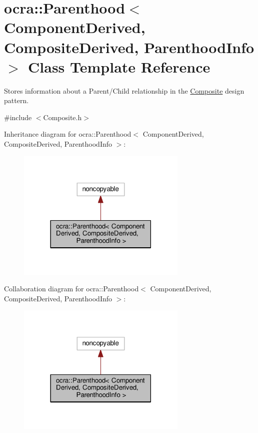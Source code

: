 \hypertarget{classocra_1_1Parenthood}{}\section{ocra\+:\+:Parenthood$<$ Component\+Derived, Composite\+Derived, Parenthood\+Info $>$ Class Template Reference}
\label{classocra_1_1Parenthood}


Stores information about a Parent/\+Child relationship in the \hyperlink{classocra_1_1Composite}{Composite} design pattern.  




{\ttfamily \#include $<$Composite.\+h$>$}



Inheritance diagram for ocra\+:\+:Parenthood$<$ Component\+Derived, Composite\+Derived, Parenthood\+Info $>$\+:
\nopagebreak
\begin{figure}[H]
\begin{center}
\leavevmode
\includegraphics[width=230pt]{d3/d99/classocra_1_1Parenthood__inherit__graph}
\end{center}
\end{figure}


Collaboration diagram for ocra\+:\+:Parenthood$<$ Component\+Derived, Composite\+Derived, Parenthood\+Info $>$\+:
\nopagebreak
\begin{figure}[H]
\begin{center}
\leavevmode
\includegraphics[width=230pt]{d2/dba/classocra_1_1Parenthood__coll__graph}
\end{center}
\end{figure}
